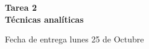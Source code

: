 \documentclass[12pt]{exam}
\begin{document}
\centering


\Large 
\textbf{\huge Tarea 2\\ \large Técnicas analíticas}

\small
Fecha de entrega lunes 25 de Octubre
\vskip10pt

\normalsize

\pointformat{\bfseries\boldmath(\thepoints)}
\vskip10pt
\end{document}
